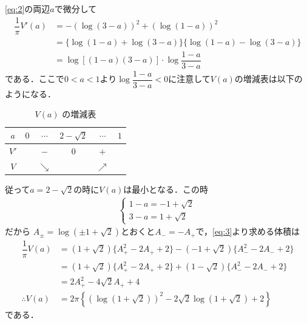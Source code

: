 \documentclass[../../main.tex]{subfiles}
\begin{document}
\cref{eq:2}の両辺$a$で微分して
\begin{align}
  \dfrac{1}{\pi} V'(a)
  &= - (\log(3-a))^2 + (\log(1-a))^2 \\
  &= \{ \log(1-a) + \log(3-a) \} \{ \log(1-a) - \log(3-a) \} \\
  &= \log\left[(1-a)(3-a)\right] \cdot \log \dfrac{1-a}{3-a}
\end{align}
である．ここで$0<a<1$より$\log \dfrac{1-a}{3-a} < 0$に注意して$V(a)$の増減表は以下のようになる．

\begin{table}[htb]
  \centering
  \caption{$V(a)$ の増減表}
  \begin{tabular}{|c|c|c|c|c|c|}
    \hline
    $a$ & $0$ & $\cdots$ & $2-\sqrt{2}$ & $\cdots$ & $1$ \\ \hline
    $V'$ & & $-$ & $0$ & $+$ & \\ \hline
    $V$ & & $\searrow$ & & $\nearrow$ & \\ \hline
  \end{tabular}
\end{table}

従って$a=2-\sqrt{2}$の時に$V(a)$は最小となる．この時
\begin{align}
  \begin{cases}
    1-a = -1+\sqrt{2} \\
    3-a = 1+\sqrt{2}
  \end{cases}
\end{align}
だから $A_{\pm}=\log(\pm 1+\sqrt{2})$とおくと$A_{-}=-A_{+}$で，\cref{eq:3}より求める体積は
\begin{align}
  \dfrac{1}{\pi} V(a)
  &= (1+\sqrt{2}) \{ A_{+}^2 - 2A_{+} + 2 \} - (-1+\sqrt{2}) \{ A_{-}^2 - 2A_{-} + 2 \} \\
  &= (1+\sqrt{2}) \{ A_{+}^2 - 2A_{+} + 2 \} + (1-\sqrt{2}) \{ A_{-}^2 - 2A_{-} + 2 \} \\
  &= 2A_{+}^2 - 4\sqrt{2}A_{+} + 4 \\
  \therefore
  V(a) & = 2\pi \left\{ (\log(1+\sqrt{2}))^2 - 2\sqrt{2}\log(1+\sqrt{2}) + 2 \right\}
\end{align}
である．
\end{document}
